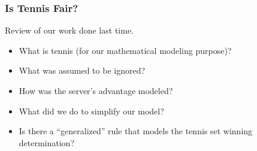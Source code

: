 \documentclass[hyperref={colorlinks=false},compress,handout,10pt]{beamer}
\let\olditem\item
\renewcommand{\item}{\setlength{\itemsep}{0.5\baselineskip}\olditem}
\begin{document}
\begin{frame}
    \frametitle{Is Tennis Fair?}
    Review of our work done last time. 
    \begin{itemize}
        \item What is tennis (for our mathematical modeling purpose)? 
        \item What was assumed to be ignored? 
        \item How was the server's advantage modeled? 
        \item What did we do to simplify our model? 
        \item Is there a ``generalized'' rule that models the tennis set
            winning determination? 
    \end{itemize}
\end{frame}





\end{document}
